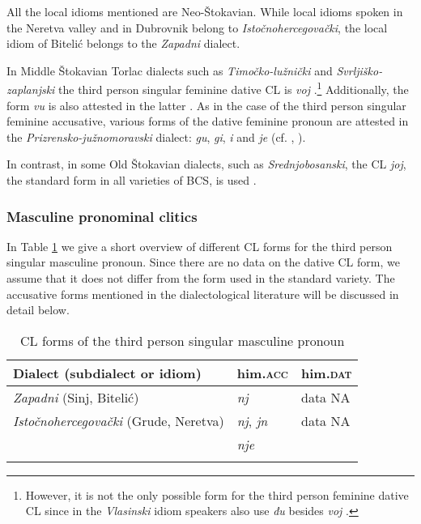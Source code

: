 \noindent All the local idioms mentioned are Neo-Štokavian. While local idioms spoken in the Neretva valley and in Dubrovnik belong to \textit{Istočnohercegovački}, the local idiom of Bitelić belongs to the \textit{Zapadni} dialect. 

In Middle Štokavian Torlac dialects such as \textit{Timočko-lužnički} and \textit{Svrljiško-zaplanjski} the third person singular feminine dative CL is \textit{voj} \citep[cf.][272, 254]{Okuka08}.\footnote{However, it is not the only possible form for the third person feminine dative CL since in the \textit{Vlasinski} idiom speakers also use \textit{đu} besides \textit{voj} \citep[cf.][273]{Okuka08}.} Additionally, the form \textit{vu} is also attested in the latter \citep[cf.][254]{Okuka08}. As in the case of the third person singular feminine accusative, various forms of the dative feminine pronoun are attested in the \textit{Prizrensko-južnomoravski} dialect: \textit{gu}, \textit{gi}, \textit{i} and \textit{je} (cf. \citealt[237]{Okuka08}, \citealt[51]{Mladenovic10}). 

In contrast, in some Old Štokavian dialects, such as \textit{Srednjobosanski}, the CL \textit{joj}, the standard form in all varieties of BCS, is used \citep[cf.][58]{HTS09}.

\subsubsection{Masculine pronominal clitics}

In Table \ref{T7.3} we give a short overview of different CL forms for the third person singular masculine pronoun. Since there are no data on the dative CL form, we assume that it does not differ from the form used in the standard variety. The accusative forms mentioned in the dialectological literature will be discussed in detail below. 

\begin{table}
\caption{CL forms of the third person singular masculine pronoun\label{T7.3}}
\begin{tabular}{lll}
\lsptoprule
Dialect (subdialect or idiom)& him.\textsc{acc}& him.\textsc{dat} \\\midrule
\textit{Zapadni} (Sinj, Bitelić) & \textit{nj}& data NA \\
\textit{Istočnohercegovački} (Grude, Neretva) & \textit{nj}, \textit{jn} & data NA \\
                                              & \textit{nje}& \\
\lspbottomrule
\end{tabular}
\end{table}

